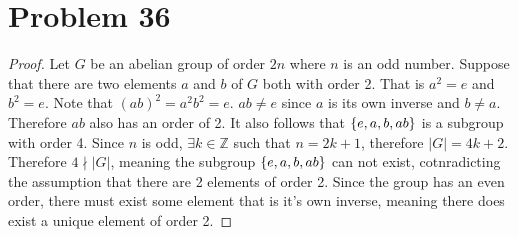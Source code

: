 \documentclass[12pt]{extarticle}
\begin{document}
\section*{Problem 36}
\begin{proof}
	Let $G$ be an abelian group of order $2n$ where $n$ is an odd number. Suppose that there are two elements $a$ and $b$ of $G$ both with order 2. That is $a^2 = e$ and $b^2 = e$. Note that $(ab)^2 = a^2 b^2 = e$. $ab \neq e$ since $a$ is its own inverse and $b \neq a$. Therefore $ab$ also has an order of 2. It also follows that $\qty{e, a, b, ab}$ is a subgroup with order 4. Since $n$ is odd, $\exists k \in \mathbb{Z}$ such that $n = 2k +1$, therefore $|G| = 4k + 2$. Therefore $4 \nmid |G|$, meaning the subgroup $\qty{e,a,b,ab}$ can not exist, cotnradicting the assumption that there are 2 elements of order 2. Since the group has an even order, there must exist some element that is it's own inverse, meaning there does exist a unique element of order 2.
\end{proof}
\end{document}
